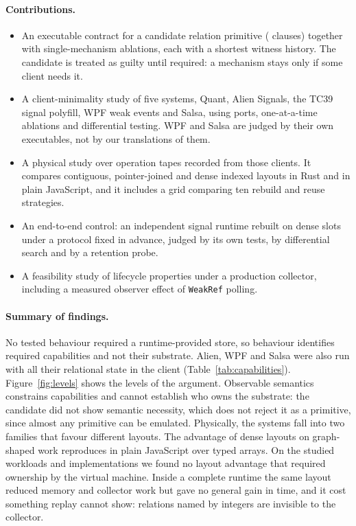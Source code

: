 \documentclass[11pt]{article}
\begin{document}
\paragraph{Contributions.}
\begin{itemize}
\item An executable contract for a candidate relation primitive (\clauseCount{} clauses) together with \ablationCount{} single-mechanism ablations, each with a shortest witness history. The candidate is treated as guilty until required: a mechanism stays only if some client needs it.
\item A client-minimality study of five systems, Quant, Alien Signals, the TC39 signal polyfill, WPF weak events and Salsa, using ports, one-at-a-time ablations and differential testing. WPF and Salsa are judged by their own executables, not by our translations of them.
\item A physical study over operation tapes recorded from those clients. It compares contiguous, pointer-joined and dense indexed layouts in Rust and in plain JavaScript, and it includes a grid comparing ten rebuild and reuse strategies.
\item An end-to-end control: an independent signal runtime rebuilt on dense slots under a protocol fixed in advance, judged by its own tests, by differential search and by a retention probe.
\item A feasibility study of lifecycle properties under a production collector, including a measured observer effect of \texttt{WeakRef} polling.
\end{itemize}

\paragraph{Summary of findings.}
No tested behaviour required a runtime-provided store, so behaviour identifies required capabilities and not their substrate. Alien, WPF and Salsa were also run with all their relational state in the client (Table~\ref{tab:capabilities}). Figure~\ref{fig:levels} shows the levels of the argument. Observable semantics constrains capabilities and cannot establish who owns the substrate: the candidate did not show semantic necessity, which does not reject it as a primitive, since almost any primitive can be emulated. Physically, the systems fall into two families that favour different layouts. The advantage of dense layouts on graph-shaped work reproduces in plain JavaScript over typed arrays. On the studied workloads and implementations we found no layout advantage that required ownership by the virtual machine. Inside a complete runtime the same layout reduced memory and collector work but gave no general gain in time, and it cost something replay cannot show: relations named by integers are invisible to the collector.
\end{document}
